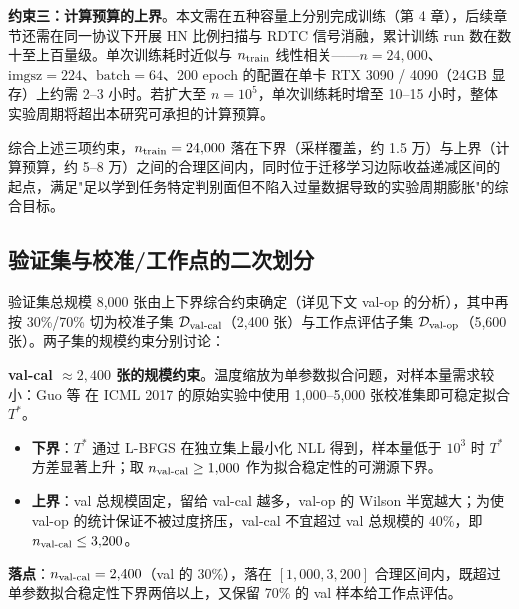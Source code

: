 \documentclass[UTF8,openany,12pt]{ctexbook}
\begin{document}
\textbf{约束三：计算预算的上界}。本文需在五种容量上分别完成训练（第 4 章），后续章节还需在同一协议下开展 HN 比例扫描与 RDTC 信号消融，累计训练 run 数在数十至上百量级。单次训练耗时近似与 $n_{\rm train}$ 线性相关——$n = 24{,}000$、$\mathrm{imgsz} = 224$、$\mathrm{batch} = 64$、200 epoch 的配置在单卡 RTX 3090 / 4090（24GB 显存）上约需 2--3 小时。若扩大至 $n = 10^5$，单次训练耗时增至 10--15 小时，整体实验周期将超出本研究可承担的计算预算。

综合上述三项约束，$n_{\rm train} = 24{,}000$ 落在下界（采样覆盖，约 1.5 万）与上界（计算预算，约 5--8 万）之间的合理区间内，同时位于迁移学习边际收益递减区间的起点，满足"足以学到任务特定判别面但不陷入过量数据导致的实验周期膨胀"的综合目标。

\subsection{验证集与校准/工作点的二次划分}
验证集总规模 8{,}000 张由上下界综合约束确定（详见下文 val-op 的分析），其中再按 30\%/70\% 切为校准子集 $\mathcal{D}_{\rm val\text{-}cal}$（2{,}400 张）与工作点评估子集 $\mathcal{D}_{\rm val\text{-}op}$（5{,}600 张）。两子集的规模约束分别讨论：

\textbf{val-cal $\approx 2{,}400$ 张的规模约束}。温度缩放为单参数拟合问题，对样本量需求较小：Guo 等\cite{guo2017calibration} 在 ICML 2017 的原始实验中使用 1{,}000--5{,}000 张校准集即可稳定拟合 $T^{\ast}$。
\begin{itemize}[leftmargin=2em,nosep]
\item \textbf{下界}：$T^{\ast}$ 通过 L-BFGS 在独立集上最小化 NLL 得到，样本量低于 $10^3$ 时 $T^{\ast}$ 方差显著上升；取 $n_{\rm val\text{-}cal} \geq 1{,}000$ 作为拟合稳定性的可溯源下界。
\item \textbf{上界}：val 总规模固定，留给 val-cal 越多，val-op 的 Wilson 半宽越大；为使 val-op 的统计保证不被过度挤压，val-cal 不宜超过 val 总规模的 40\%，即 $n_{\rm val\text{-}cal} \leq 3{,}200$。
\end{itemize}
\textbf{落点}：$n_{\rm val\text{-}cal} = 2{,}400$（val 的 30\%），落在 $[1{,}000, 3{,}200]$ 合理区间内，既超过单参数拟合稳定性下界两倍以上，又保留 70\% 的 val 样本给工作点评估。
\end{document}
